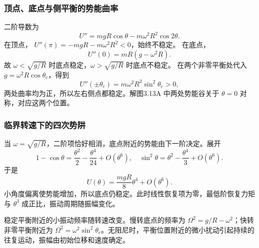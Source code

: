 \documentclass[UTF8,fontset=fandol,a4paper,11pt]{ctexart}
\begin{document}
\subsubsection*{顶点、底点与侧平衡的势能曲率}
二阶导数为
\[
U''=mgR\cos\theta-m\omega^2R^2\cos2\theta.
\]
在顶点，
$U''(\pi)=-mgR-m\omega^2R^2<0$，始终不稳定。
在底点，
\[
U''(0)=mR(g-\omega^2R).
\]
故 $\omega<\sqrt{g/R}$ 时底点稳定，$\omega>\sqrt{g/R}$ 时底点不稳定。
在两个非零平衡处代入 $g=\omega^2R\cos\theta_e$，得到
\[
U''(\pm\theta_e)=m\omega^2R^2\sin^2\theta_e>0,
\]
两处曲率均为正，所以左右侧点都稳定。解图3.13A 中两处势能谷关于 $\theta=0$ 对称，对应这两个位置。

\subsubsection*{临界转速下的四次势阱}
当 $\omega=\sqrt{g/R}$，二阶项恰好相消，底点附近的势能由下一阶决定。展开
\[
1-\cos\theta=\frac{\theta^2}{2}-\frac{\theta^4}{24}+O(\theta^6),
\quad
\sin^2\theta=\theta^2-\frac{\theta^4}{3}+O(\theta^6).
\]
于是
\[
U(\theta)=\frac{mgR}{8}\theta^4+O(\theta^6).
\]
小角度偏离使势能增加，所以底点仍稳定。此时线性恢复项为零，最低阶恢复力矩与 $\theta^3$ 成正比，振动周期随振幅变化。

稳定平衡附近的小振动频率随转速改变。慢转底点的频率为
$\Omega^2=g/R-\omega^2$；快转非零平衡附近为
$\Omega^2=\omega^2\sin^2\theta_e$。无阻尼时，平衡位置附近的微小扰动引起持续的往复运动，振幅由初始位移和速度确定。
\end{document}
